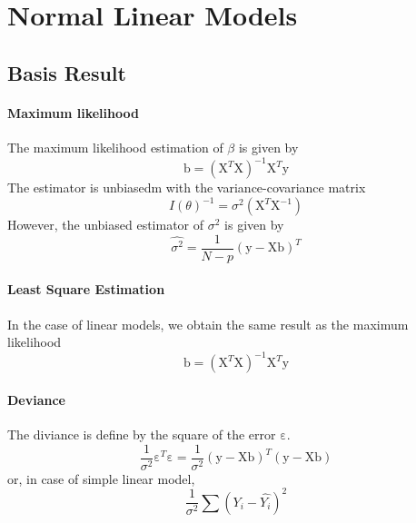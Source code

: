 \section{Normal Linear Models}
\subsection{Basis Result}

\paragraph{Maximum likelihood}
The maximum likelihood estimation of $\beta$ is given by
\[ \mathrm{b} = (\mathrm{X}^T \mathrm{X})^{-1} \mathrm{X}^T \mathrm{y} \]
The estimator is unbiasedm with the variance-covariance matrix
\[ I(\theta)^{-1} = \sigma^2 (\mathrm{X}^T \mathrm{X}^{-1}) \]
However, the unbiased estimator of $\sigma^2$ is given by
\[ \hat{\sigma^2} = \frac{1}{N-p} (\mathrm{y} - \mathrm{X}\mathrm{b})^T \]

\paragraph{Least Square Estimation}
In the case of linear models, we obtain the same result as the maximum likelihood
\[ \mathrm{b} = (\mathrm{X}^T \mathrm{X})^{-1} \mathrm{X}^T \mathrm{y} \]

\paragraph{Deviance}
The diviance is define by the square of the error $\mathrm{\varepsilon}$.
\[ \frac{1}{\sigma^2} \mathrm{\varepsilon}^T \mathrm{\varepsilon} = \frac{1}{\sigma^2} (\mathrm{y} - \mathrm{X}\mathrm{b})^T(\mathrm{y} - \mathrm{X}\mathrm{b}) \]
or, in case of simple linear model,
\[ \frac{1}{\sigma^2} \sum (Y_i - \hat{Y_i})^2 \]

